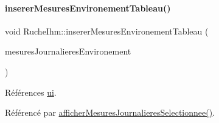 \paragraph{\texorpdfstring{inserer\+Mesures\+Environement\+Tableau()}{insererMesuresEnvironementTableau()}}
{\footnotesize\ttfamily void Ruche\+Ihm\+::inserer\+Mesures\+Environement\+Tableau (\begin{DoxyParamCaption}\item[{Q\+Vector$<$ Q\+String\+List $>$}]{mesures\+Journalieres\+Environement }\end{DoxyParamCaption})\hspace{0.3cm}{\ttfamily [private]}}



Références \hyperlink{class_ruche_ihm_a64786058bd7f88ca2f1e9743bb27c25b}{ui}.



Référencé par \hyperlink{class_ruche_ihm_a7f66af552d9e7ba0d00437ff3b330706}{afficher\+Mesures\+Journalieres\+Selectionnee()}.


